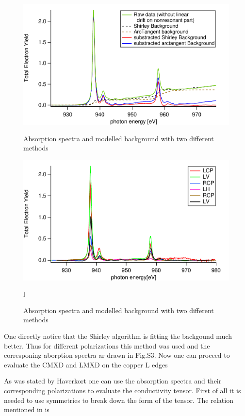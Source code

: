 \documentclass[twoside,twocolumn, elsart]{article}
\begin{document}
\begin{figure}
    \begin{minipage}[bp!]{\columnwidth}
        \includegraphics[width=\textwidth]{Graphics/ShirleyBack.pdf}
        \caption{Absorption spectra and modelled background with two different methods}
        \label{fig2}
    \end{minipage}
    \hfil
	\begin{minipage}[bp!]{\columnwidth}
        \includegraphics[width=\textwidth]{Graphics/TEY.pdf}
        \caption{Absorption spectra and modelled background with two different methods}
        \label{fig2}
    \end{minipage}l
\end{figure}
One directly notice that the Shirley algorithm is fitting the backgound much better. Thus for different polarizations this method was used and the corresponing aborption spectra ar drawn in Fig.S3. Now one can proceed to evaluate the CMXD and LMXD on the copper L edges

As was stated by Haverkort \cite{Haverkort} one can use the absorption spectra and their corresponding polarizations to evaluate the conductivity tensor. First of all it is needed to use symmetries to break down the form of the tensor. The relation mentioned in \cite{Haverkort} is
\end{document}
